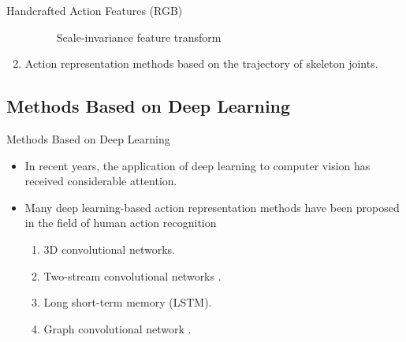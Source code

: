 \begin{frame}{Handcrafted Action Features (RGB)}
\begin{enumerate}
{\begin{figure}[htp]
                      \caption{Scale-invariance feature transform}
                  \end{figure}
              }
        \item<3-> Action representation methods based on the trajectory of skeleton joints.
    \end{enumerate}
\end{frame}

\subsection{Methods Based on Deep Learning}
\begin{frame}{Methods Based on Deep Learning}
    \begin{itemize}
        \item In recent years, the application of deep learning to computer vision has received considerable attention.
        \item Many deep learning-based action representation methods have been proposed in the field of human action recognition
              \begin{enumerate}
                  \item 3D convolutional networks.
                  \item Two-stream convolutional networks \cite{simonyan2014two}.
                  \item Long short-term memory (LSTM).
                  \item Graph convolutional network \cite{liu2020disentangling}.
              \end{enumerate}
    \end{itemize}
\end{frame}


